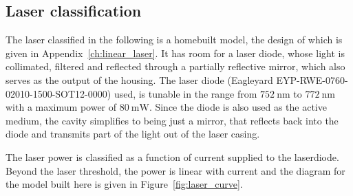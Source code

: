 \subsection{Laser classification}

The laser classified in the following is a homebuilt model, the design of which is given in Appendix~\ref{ch:linear_laser}. It has room for a laser diode, whose light is collimated, filtered and reflected through a partially reflective mirror, which also serves as the output of the housing.
The laser diode (Eagleyard EYP-RWE-0760-02010-1500-SOT12-0000) used, is tunable in the range from $\SI{752}{\nano\meter}$ to $\SI{772}{\nano\meter}$ with a maximum power of $\SI{80}{\milli\watt}$. Since the diode is also used as the active medium, the cavity simplifies to being just a mirror, that reflects back into the diode and transmits part of the light out of the laser casing.

The laser power is classified as a function of current supplied to the laserdiode. Beyond the laser threshold, the power is linear with current and the diagram for the model built here is given in Figure~\ref{fig:laser_curve}.


\begin{figure}[tbp]%
\end{figure}

